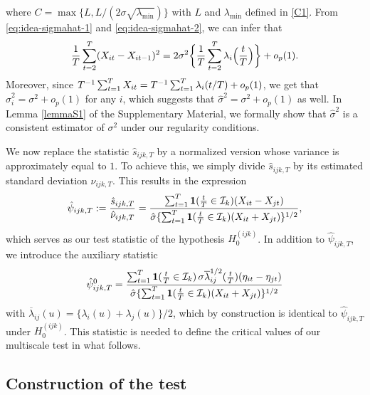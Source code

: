 \documentclass[a4paper,12pt]{article}
\numberwithin{equation}{section}
\begin{document}
{where $C = \max\{L, L / (2 \sigma \sqrt{\lambda_{\min}})\}$ with $L$ and $\lambda_{\min}$ defined in \ref{C1}. From \eqref{eq:idea-sigmahat-1} and \eqref{eq:idea-sigmahat-2}, we can infer that 
\[ \frac{1}{T} \sum_{t=2}^T (X_{it} - X_{it-1})^2 = 2 \sigma^2 \bigg\{ \frac{1}{T} \sum_{t=2}^T \lambda_i\Big(\frac{t}{T}\Big) \bigg\} + o_p(1). \]
Moreover, since $T^{-1} \sum_{t=1}^T X_{it} = T^{-1} \sum_{t=1}^T \lambda_i(t/T) + o_p(1)$, we get that $\hat{\sigma}_i^2 = \sigma^2 + o_p(1)$ for any $i$, which suggests that $\hat{\sigma}^2 = \sigma^2 + o_p(1)$ as well. In Lemma \ref{lemmaS1} of the Supplementary Material, we formally show that $\hat{\sigma}^2$ is a consistent estimator of $\sigma^2$ under our regularity conditions. 


We now replace the statistic $\hat{s}_{ijk,T}$ by a normalized version whose variance is approximately equal to $1$. To achieve this, we simply divide $\hat{s}_{ijk,T}$ by its estimated standard deviation $\hat{\nu}_{ijk,T}$. This results in the expression 
\begin{equation}\label{eq:stat}
\hat{\psi}_{ijk,T} := \frac{\hat{s}_{ijk,T}}{\hat{\nu}_{ijk,T}} = \frac{\sum\nolimits_{t=1}^T \boldsymbol{1}(\frac{t}{T} \in \mathcal{I}_k) (X_{it} - X_{jt})}{ \hat{\sigma} \{ \sum\nolimits_{t=1}^T \boldsymbol{1}(\frac{t}{T} \in \mathcal{I}_k) (X_{it} + X_{jt}) \}^{1/2}}, 
\end{equation}
which serves as our test statistic of the hypothesis $H_0^{(ijk)}$. In addition to $\hat{\psi}_{ijk,T}$, we introduce the auxiliary statistic 
\begin{equation}\label{eq:stat0}
\hat{\psi}_{ijk,T}^0 = \frac{\sum\nolimits_{t=1}^T \boldsymbol{1}(\frac{t}{T} \in \mathcal{I}_k) \, \sigma \overline{\lambda}_{ij}^{1/2}(\frac{t}{T}) (\eta_{it} - \eta_{jt})}{ \hat{\sigma} \{ \sum\nolimits_{t=1}^T \boldsymbol{1}(\frac{t}{T} \in \mathcal{I}_k) (X_{it} + X_{jt}) \}^{1/2}}
\end{equation}
with $\overline{\lambda}_{ij}(u) = \{ \lambda_i(u) + \lambda_j(u) \}/2$, which by construction is identical to $\hat{\psi}_{ijk,T}$ under $H_0^{(ijk)}$. This statistic is needed to define the critical values of our multiscale test in what follows.
}


\subsection{Construction of the test} 
\end{document}

